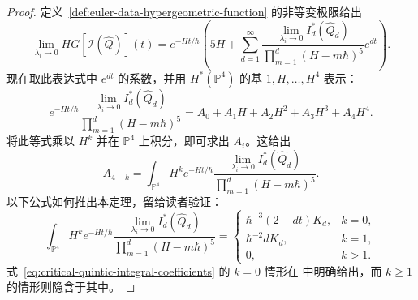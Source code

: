 \begin{proof}
定义~\ref{def:euler-data-hypergeometric-function} 的非等变极限给出
\[
\lim_{\lambda_i\to0}HG[\mathcal I(\widehat Q)](t)
=e^{-Ht/\hbar}\left(5H+\sum_{d=1}^{\infty}
\frac{\lim_{\lambda_i\to0}I_d^*(\widehat Q_d)}{\prod_{m=1}^d(H-m\hbar)^5}e^{dt}\right).
\]
现在取此表达式中 $e^{dt}$ 的系数，并用 $H^*(\mathbb P^4)$ 的基 $1,H,\ldots,H^4$ 表示：
\[
e^{-Ht/\hbar}\frac{\lim_{\lambda_i\to0}I_d^*(\widehat Q_d)}{\prod_{m=1}^d(H-m\hbar)^5}
=A_0+A_1H+A_2H^2+A_3H^3+A_4H^4.
\]
将此等式乘以 $H^k$ 并在 $\mathbb P^4$ 上积分，即可求出 $A_i$。这给出
\[
A_{4-k}=\int_{\mathbb P^4}H^ke^{-Ht/\hbar}
\frac{\lim_{\lambda_i\to0}I_d^*(\widehat Q_d)}{\prod_{m=1}^d(H-m\hbar)^5}.
\]
以下公式如何推出本定理，留给读者验证：
\begin{equation}\label{eq:critical-quintic-integral-coefficients}
\int_{\mathbb P^4}H^ke^{-Ht/\hbar}
\frac{\lim_{\lambda_i\to0}I_d^*(\widehat Q_d)}{\prod_{m=1}^d(H-m\hbar)^5}
=\begin{cases}
\hbar^{-3}(2-dt)K_d,&k=0,\\
\hbar^{-2}dK_d,&k=1,\\
0,&k>1.
\end{cases}
\end{equation}
式~\eqref{eq:critical-quintic-integral-coefficients} 的 $k=0$ 情形在  中明确给出，而 $k\ge1$ 的情形则隐含于其中。


\end{proof}

